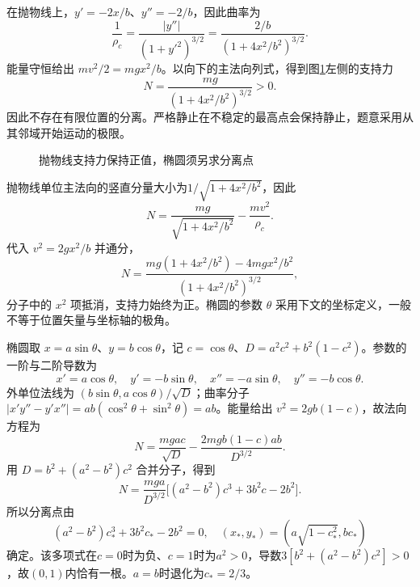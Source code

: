 \begin{solution}
在抛物线上，$y'=-2x/b$、$y''=-2/b$，因此曲率为
\[
\frac1{\rho_c}=\frac{|y''|}{(1+y'^2)^{3/2}}
=\frac{2/b}{(1+4x^2/b^2)^{3/2}}.
\]
能量守恒给出 $mv^2/2=mgx^2/b$。以向下的主法向列式，得到图\ref{fig:hw2-2-s}左侧的支持力
\[
 \boxed{N=\frac{mg}{(1+4x^2/b^2)^{3/2}}>0}.
\]
因此不存在有限位置的分离。严格静止在不稳定的最高点会保持静止，题意采用从其邻域开始运动的极限。

\begin{figure}[H]\centering
{}
\caption{抛物线支持力保持正值，椭圆须另求分离点}\label{fig:hw2-2-s}
\end{figure}

抛物线单位主法向的竖直分量大小为$1/\sqrt{1+4x^2/b^2}$，因此
\[
 N=\frac{mg}{\sqrt{1+4x^2/b^2}}-\frac{mv^2}{\rho_c}.
\]
代入 $v^2=2gx^2/b$ 并通分，
\[
N=\frac{mg(1+4x^2/b^2)-4mgx^2/b^2}{(1+4x^2/b^2)^{3/2}},
\]
分子中的 $x^2$ 项抵消，支持力始终为正。椭圆的参数 $\theta$ 采用下文的坐标定义，一般不等于位置矢量与坐标轴的极角。

椭圆取 $x=a\sin\theta$、$y=b\cos\theta$，记 $c=\cos\theta$、$D=a^2c^2+b^2(1-c^2)$。参数的一阶与二阶导数为
\[
x'=a\cos\theta,\quad y'=-b\sin\theta,\quad
x''=-a\sin\theta,\quad y''=-b\cos\theta.
\]
外单位法线为 $(b\sin\theta,a\cos\theta)/\sqrt D$；曲率分子 $|x'y''-y'x''|=ab(\cos^2\theta+\sin^2\theta)=ab$。能量给出 $v^2=2gb(1-c)$，故法向方程为
\[
N=\frac{mgac}{\sqrt D}-\frac{2mgb(1-c)ab}{D^{3/2}}.
\]
用 $D=b^2+(a^2-b^2)c^2$ 合并分子，得到
\[
 N=\frac{mga}{D^{3/2}}\big[(a^2-b^2)c^3+3b^2c-2b^2\big].
\]
所以分离点由
\[
 \boxed{(a^2-b^2)c_*^3+3b^2c_*-2b^2=0,\quad
 (x_*,y_*)=(a\sqrt{1-c_*^2},bc_*)}
\]
确定。该多项式在$c=0$时为负、$c=1$时为$a^2>0$，导数$3[b^2+(a^2-b^2)c^2]>0$，故$(0,1)$内恰有一根。$a=b$时退化为$c_*=2/3$。


\end{solution}



